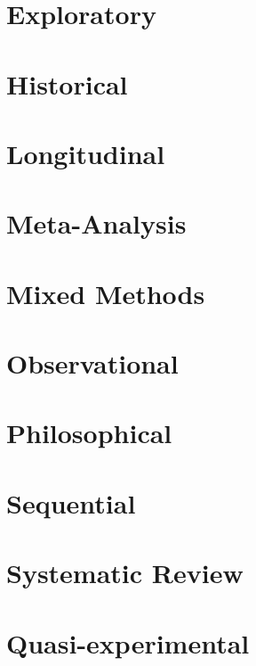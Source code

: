 \documentclass[]{book}
\begin{document}
\hypertarget{exploratory}{%
\section{Exploratory}\label{exploratory}}

\hypertarget{historical}{%
\section{Historical}\label{historical}}

\hypertarget{longitudinal}{%
\section{Longitudinal}\label{longitudinal}}

\hypertarget{meta-analysis}{%
\section{Meta-Analysis}\label{meta-analysis}}

\hypertarget{mixed-methods}{%
\section{Mixed Methods}\label{mixed-methods}}

\hypertarget{observational}{%
\section{Observational}\label{observational}}

\hypertarget{philosophical}{%
\section{Philosophical}\label{philosophical}}

\hypertarget{sequential}{%
\section{Sequential}\label{sequential}}

\hypertarget{systematic-review}{%
\section{Systematic Review}\label{systematic-review}}

\hypertarget{quasi-experimental}{%
\section{Quasi-experimental}\label{quasi-experimental}}
\end{document}
